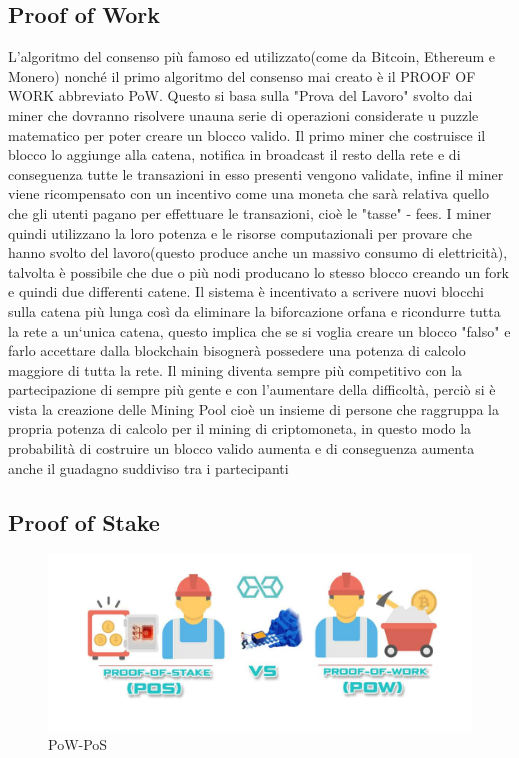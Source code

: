 \documentclass[12pt,titlepage]{report}
\begin{document}
\subsection{Proof of Work}
L'algoritmo del consenso più famoso ed utilizzato(come da Bitcoin, Ethereum e Monero) nonché il primo algoritmo del consenso mai creato è il PROOF OF WORK abbreviato PoW. Questo si basa sulla "Prova del Lavoro" svolto dai miner che dovranno risolvere unauna serie di operazioni considerate u puzzle matematico per poter creare un blocco valido. Il primo miner che costruisce il blocco lo aggiunge alla catena, notifica in broadcast il resto della rete e di conseguenza tutte le transazioni in esso presenti vengono validate, infine il miner viene ricompensato con un incentivo come una moneta che sarà relativa quello che gli utenti pagano per effettuare le transazioni, cioè le "tasse" - fees. I miner quindi utilizzano la loro potenza e le risorse computazionali per provare che hanno svolto del lavoro(questo produce anche un massivo consumo di elettricità), talvolta è possibile che due o più nodi producano lo stesso blocco creando un fork e quindi due differenti catene. Il sistema è incentivato a scrivere nuovi blocchi sulla catena più lunga così da eliminare la biforcazione orfana e ricondurre tutta la rete a un`unica catena, questo implica che se si voglia creare un blocco "falso" e farlo accettare dalla blockchain bisognerà possedere una potenza di calcolo maggiore di tutta la rete. Il mining diventa sempre più competitivo con la partecipazione di sempre più gente e con l'aumentare della difficoltà, perciò si è vista la creazione delle Mining Pool cioè un insieme di persone che raggruppa la propria potenza di calcolo per il mining di criptomoneta, in questo modo la probabilità di costruire un blocco valido aumenta e di conseguenza aumenta anche il guadagno suddiviso tra i partecipanti

\subsection{Proof of Stake}
\begin{figure}[h]
	\includegraphics[width=\textwidth]{pow-pos}
	\centering
	\caption{PoW-PoS}
	\label{fig:pow-pos}
\end{figure}
\end{document}

